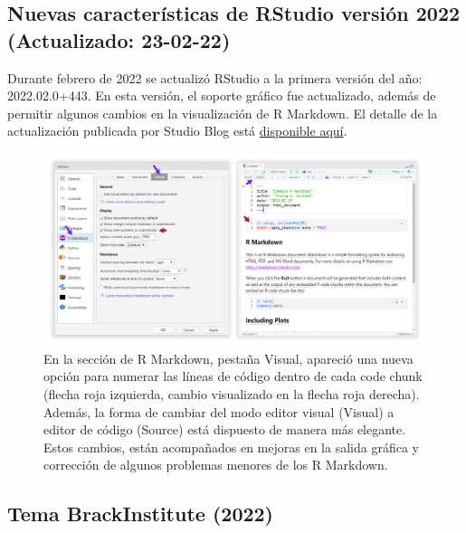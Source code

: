 \documentclass[
]{article}
\theoremstyle{definition}
\theoremstyle{definition}
\theoremstyle{definition}
\theoremstyle{definition}
\theoremstyle{remark}
\begin{document}
\hypertarget{nuevas-caracteruxedsticas-de-rstudio-versiuxf3n-2022-actualizado-23-02-22}{%
\subsection{Nuevas características de RStudio versión 2022 (Actualizado: 23-02-22)}\label{nuevas-caracteruxedsticas-de-rstudio-versiuxf3n-2022-actualizado-23-02-22}}

Durante febrero de 2022 se actualizó RStudio a la primera versión del año: 2022.02.0+443. En esta versión, el soporte gráfico fue actualizado, además de permitir algunos cambios en la visualización de R Markdown. El detalle de la actualización publicada por Studio Blog está \href{https://www.rstudio.com/blog/rstudio-2022-02-0-what-s-new/}{disponible aquí}.



\begin{figure}

{\centering \includegraphics[width=1\linewidth]{figs/screenshots/actualizacion RStudio 2022} 

}

\caption{En la sección de R Markdown, pestaña Visual, apareció una nueva opción para numerar las líneas de código dentro de cada code chunk (flecha roja izquierda, cambio visualizado en la flecha roja derecha). Además, la forma de cambiar del modo editor visual (Visual) a editor de código (Source) está dispuesto de manera más elegante. Estos cambios, están acompañados en mejoras en la salida gráfica y corrección de algunos problemas menores de los R Markdown.}\label{fig:figura11}
\end{figure}

\hypertarget{tema-brackinstitute-2022}{%
\subsection{Tema BrackInstitute (2022)}\label{tema-brackinstitute-2022}}
\end{document}

